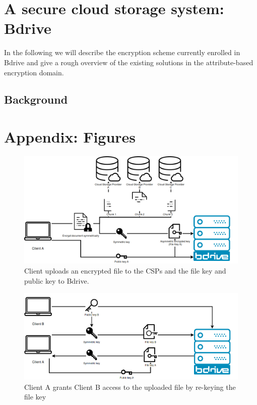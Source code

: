 \section{A secure cloud storage system: Bdrive}
In the following we will describe the encryption scheme currently enrolled in Bdrive and give a rough overview of the existing solutions in the attribute-based encryption domain.

\subsection{Background}
\section{Appendix: Figures}
\begin{figure}[!ht]
\centering
    \includegraphics[width=0.8\linewidth]{img/bdrive1.png}\par 
    \caption{Client uploads an encrypted file to the CSPs and the file key and public key to Bdrive.}
    \label{fig:filekey}
\end{figure}
\begin{figure}[!ht]
\centering
    \includegraphics[width=0.8\linewidth]{img/bdrive2.png}\par
    \caption{Client A grants Client B access to the uploaded file by re-keying the file key}
    \label{fig:rekey}
\end{figure}

